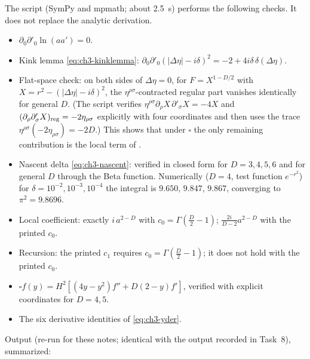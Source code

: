 The script  (SymPy and mpmath; about 2.5~s) performs the following checks. It does not replace the analytic derivation.
\begin{itemize}[leftmargin=24pt]
\item[(a)] $\partial_0\partial'_0\ln(aa')=0$.
\item[(b)] Kink lemma \eqref{eq:ch3-kinklemma}: $\partial_0\partial'_0(|\Delta\eta|-i\delta)^2=-2+4i\delta\,\delta(\Delta\eta)$.
\item[(c)] Flat-space check: on both sides of $\Delta\eta=0$, for $F=X^{1-D/2}$ with $X=r^2-(|\Delta\eta|-i\delta)^2$, the $\eta^{\rho\sigma}$-contracted regular part vanishes identically
for general $D$. (The script verifies $\eta^{\rho\sigma}\partial_\rho X\,\partial'_\sigma X=-4X$ and $(\partial_\rho\partial'_\sigma X)_{\rm reg}=-2\eta_{\rho\sigma}$ explicitly with four
coordinates and then uses the trace $\eta^{\rho\sigma}(-2\eta_{\rho\sigma})=-2D$.) This shows that under $\square$ the only remaining contribution is the local term of .
\item[(d)] Nascent delta \eqref{eq:ch3-nascent}: verified in closed form for $D=3,4,5,6$ and for general $D$ through the Beta function. Numerically ($D=4$, test function $e^{-r^2}$)
for $\delta=10^{-2},10^{-3},10^{-4}$ the integral is $9.650$, $9.847$, $9.867$, converging to $\pi^2=9.8696$.
\item[(e)] Local coefficient: exactly $i\,a^{2-D}$ with $c_0=\Gamma(\tfrac D2-1)$; $\tfrac{2i}{D-2}a^{2-D}$ with the printed $c_0$.
\item[(f)] Recursion: the printed $c_1$ requires $c_0=\Gamma(\tfrac D2-1)$; it does not hold with the printed $c_0$.
\item[(g)] $\square f(y)=H^2[(4y-y^2)f''+D(2-y)f']$, verified with explicit coordinates for $D=4,5$.
\item[(h)] The six derivative identities of \eqref{eq:ch3-yder}.
\end{itemize}
Output (re-run for these notes; identical with the output recorded in Task~8), summarized:
